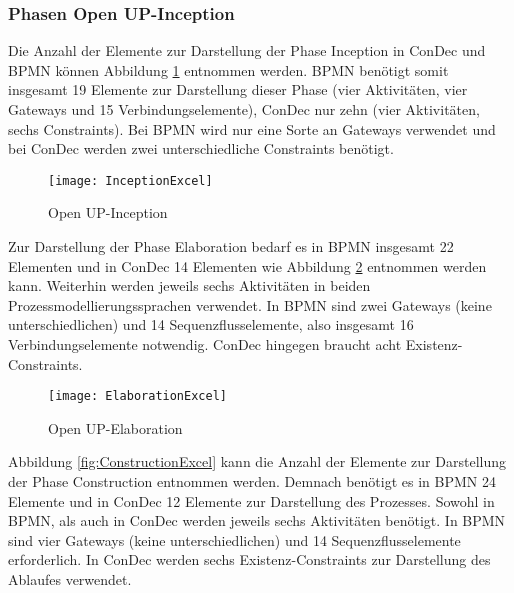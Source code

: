 \subsubsection {Phasen Open UP-Inception}

Die Anzahl der Elemente zur Darstellung der Phase Inception in ConDec und BPMN können Abbildung \ref{fig:InceptionExcel} entnommen werden. BPMN benötigt somit insgesamt 19 Elemente zur Darstellung dieser Phase (vier Aktivitäten, vier Gateways und 15 Verbindungselemente), ConDec nur zehn (vier Aktivitäten, sechs Constraints). Bei BPMN wird nur eine Sorte an Gateways verwendet und bei ConDec werden zwei unterschiedliche Constraints benötigt.\newline
\begin{figure}[htp]
\begin{center}
  \texttt{[image: InceptionExcel]} %
  \caption{Open UP-Inception}
  \label{fig:InceptionExcel}
\end{center}
\end{figure}

Zur Darstellung der Phase Elaboration bedarf es in BPMN insgesamt 22 Elementen und in ConDec 14 Elementen wie Abbildung \ref{fig:ElaborationExcel} entnommen werden kann. Weiterhin werden jeweils sechs Aktivitäten in beiden Prozessmodellierungssprachen verwendet. In BPMN sind zwei Gateways (keine unterschiedlichen) und 14 Sequenzflusselemente, also insgesamt 16 Verbindungselemente notwendig. ConDec hingegen braucht acht Existenz-Constraints. \newline

\begin{figure}[htp]
\begin{center}
  \texttt{[image: ElaborationExcel]} %
  \caption{Open UP-Elaboration}
  \label{fig:ElaborationExcel}
\end{center}
\end{figure}

Abbildung \ref{fig:ConstructionExcel} kann die Anzahl der Elemente zur Darstellung der Phase Construction entnommen werden. Demnach benötigt es in BPMN 24 Elemente und in ConDec 12 Elemente zur Darstellung des Prozesses. Sowohl in BPMN, als auch in ConDec werden jeweils sechs Aktivitäten benötigt. In BPMN sind vier Gateways (keine unterschiedlichen) und 14 Sequenzflusselemente erforderlich. In ConDec werden sechs Existenz-Constraints zur Darstellung des Ablaufes verwendet.\newline

